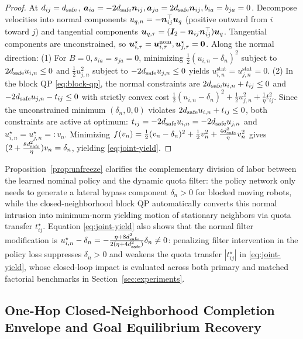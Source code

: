 \begin{proof}
At $d_{ij}=d_{\mathrm{safe}}$, $\boldsymbol a_{ia}=-2d_{\mathrm{safe}}\boldsymbol n_{ij},\boldsymbol a_{ja}=2d_{\mathrm{safe}}\boldsymbol n_{ij},b_{ia}=b_{ja}=0$. Decompose velocities into normal components $u_{q,n}=-\boldsymbol n_{ij}^{\top}\boldsymbol{u}_q$ (positive outward from $i$ toward $j$) and tangential components $\boldsymbol{u}_{q,\tau}=(\boldsymbol{I}_2-\boldsymbol n_{ij}\boldsymbol n_{ij}^{\top})\boldsymbol{u}_q$. Tangential components are unconstrained, so $\boldsymbol{u}_{i,\tau}^\star=\boldsymbol{u}_{i,\tau}^{\mathrm{nom}},\boldsymbol{u}_{j,\tau}^\star=\boldsymbol 0$. Along the normal direction: (1) For $B=0,s_{ia}=s_{ja}=0$, minimizing $\frac12(u_{i,n}-\delta_n)^2$ subject to $2d_{\mathrm{safe}} u_{i,n}\le 0$ and $\frac12 u_{j,n}^2$ subject to $-2d_{\mathrm{safe}} u_{j,n}\le 0$ yields $u_{i,n}^{\mathrm{stat}}=u_{j,n}^{\mathrm{stat}}=0$. (2) In the block QP \eqref{eq:block-qp}, the normal constraints are $2d_{\mathrm{safe}} u_{i,n}+t_{ij}\le 0$ and $-2d_{\mathrm{safe}} u_{j,n}-t_{ij}\le 0$ with strictly convex cost $\frac12(u_{i,n}-\delta_n)^2+\frac12 u_{j,n}^2+\frac{1}{\eta}t_{ij}^2$. Since the unconstrained minimum $(\delta_n,0,0)$ violates $2d_{\mathrm{safe}} u_{i,n}+t_{ij}\le 0$, both constraints are active at optimum: $t_{ij}=-2d_{\mathrm{safe}} u_{i,n}=-2d_{\mathrm{safe}} u_{j,n}$ and $u_{i,n}^\star=u_{j,n}^\star=:v_n$. Minimizing $f(v_n)=\frac12(v_n-\delta_n)^2+\frac12 v_n^2+\frac{4d_{\mathrm{safe}}^2}{\eta}v_n^2$ gives $(2+\frac{8d_{\mathrm{safe}}^2}{\eta})v_n=\delta_n$, yielding \eqref{eq:joint-yield}.
\end{proof}

Proposition~\ref{prop:unfreeze} clarifies the complementary division of labor between the learned nominal policy and the dynamic quota filter: the policy network only needs to generate a lateral bypass component $\delta_n>0$ for blocked moving robots, while the closed-neighborhood block QP automatically converts this normal intrusion into minimum-norm yielding motion of stationary neighbors via quota transfer $t_{ij}^\star$. Equation \eqref{eq:joint-yield} also shows that the normal filter modification is $u_{i,n}^\star-\delta_n=-\frac{\eta+8d_{\mathrm{safe}}^2}{2(\eta+4d_{\mathrm{safe}}^2)}\delta_n\ne 0$: penalizing filter intervention in the policy loss suppresses $\delta_n>0$ and weakens the quota transfer $|t_{ij}^\star|$ in \eqref{eq:joint-yield}, whose closed-loop impact is evaluated across both primary and matched factorial benchmarks in Section~\ref{sec:experiments}.

\subsection{One-Hop Closed-Neighborhood Completion Envelope and Goal Equilibrium Recovery}\label{subsec:envelope}


